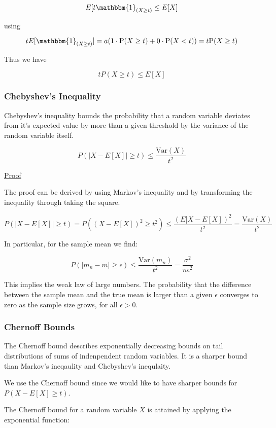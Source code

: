 \documentclass[12pt, authoryear]{elsarticle}
\begin{document}
$$ E[t \mathbbm{1}_{(X \geq t)}  \leq E[X] $$

using 

$$ t E[\mathbbm{1}_{(X \geq t)}] = a ( 1 \cdot \mathrm { P } ( X \geq t ) + 0 \cdot \mathrm { P } ( X < t ) ) = t \mathrm { P } ( X \geq t )$$

Thus we have

$$ t P(X \geq t) \leq E[X] $$

\subsubsection{Chebyshev's Inequality} \label{chebyshev}

Chebyshev's inequality bounds the probability that a random variable deviates from it's expected value by more than a given threshold by the variance of the random variable itself. 

$$ P(| X - E[X] | \geq t) \leq \frac{\text{Var}(X)}{t^2}$$

\underline{Proof}

The proof can be derived by using Markov's inequality and by transforming the inequality through taking the square.

$$ P( | X- E[X] | \geq t) = P( (X - E[X] )^2 \geq t^2) \leq \frac{(E[X - E[X])^2}{t^2} = \frac{\text{Var}(X)}{t^2}$$

In particular, for the sample mean we find:

$$ P(| m_n - m | \geq \epsilon) \leq \frac{\text{Var}(m_n)}{t^2} = \frac{\sigma^2}{n\epsilon^2} $$

This implies the weak law of large numbers. The probability that the difference between the sample mean and the true mean is larger than a given $\epsilon$ converges to zero as the sample size grows, for all $\epsilon > 0 $.

\subsubsection{Chernoff Bounds}\label{chernoff}

The Chernoff bound describes exponentially decreasing bounds on tail distributions of sums of indenpendent random variables. It is a sharper bound than Markov's ineqaulity and Chebyshev's inequlaity. 

We use the Chernoff bound since we would like to have sharper bounds for $ P( X - E[X] \geq t) $. 

The Chernoff bound for a random variable $X$ is attained by applying the exponential function:
\end{document}
